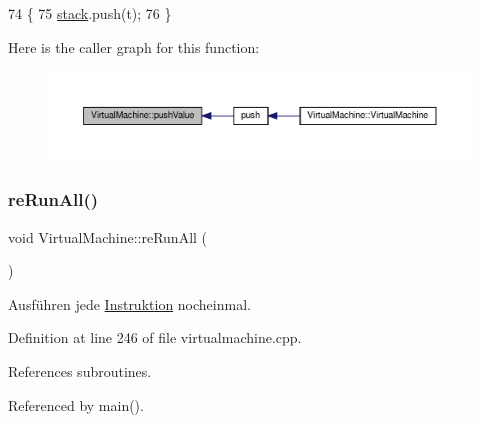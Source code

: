 \begin{DoxyCode}
74 \{
75     \mbox{\hyperlink{class_virtual_machine_a3a4c8cdda0913c9c0cdc75df23ac7cbb}{stack}}.push(t);
76 \}
\end{DoxyCode}
Here is the caller graph for this function\+:
\nopagebreak
\begin{figure}[H]
\begin{center}
\leavevmode
\includegraphics[width=350pt]{class_virtual_machine_ac20f1d6667434866f50880187c521cd4_icgraph}
\end{center}
\end{figure}
\mbox{\label{class_virtual_machine_a572584de47b0e95303e71832b684175f}} 
\subsubsection{\texorpdfstring{re\+Run\+All()}{reRunAll()}}
{\footnotesize\ttfamily void Virtual\+Machine\+::re\+Run\+All (\begin{DoxyParamCaption}{ }\end{DoxyParamCaption})}

Ausführen jede \mbox{\hyperlink{class_instruktion}{Instruktion}} nocheinmal. 

Definition at line 246 of file virtualmachine.\+cpp.



References subroutines.



Referenced by main().


